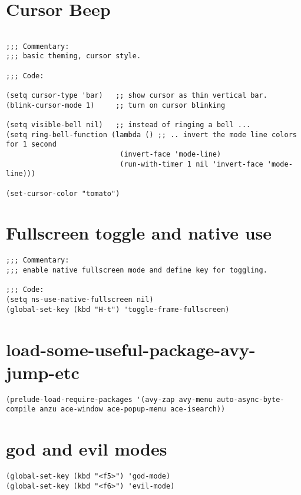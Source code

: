\documentclass[11pt]{article}
\begin{document}
\section{Cursor Beep}
\label{sec:orgd6a8681}

\begin{verbatim}

;;; Commentary:
;;; basic theming, cursor style.

;;; Code:

(setq cursor-type 'bar)   ;; show cursor as thin vertical bar.
(blink-cursor-mode 1)     ;; turn on cursor blinking

(setq visible-bell nil)   ;; instead of ringing a bell ...
(setq ring-bell-function (lambda () ;; .. invert the mode line colors for 1 second
                           (invert-face 'mode-line)
                           (run-with-timer 1 nil 'invert-face 'mode-line)))

(set-cursor-color "tomato")

\end{verbatim}

\section{Fullscreen toggle and native use}
\label{sec:orge483e92}

\begin{verbatim}
;;; Commentary:
;;; enable native fullscreen mode and define key for toggling.

;;; Code:
(setq ns-use-native-fullscreen nil)
(global-set-key (kbd "H-t") 'toggle-frame-fullscreen)
\end{verbatim}
\section{load-some-useful-package-avy-jump-etc}
\label{sec:orgbf3f289}

\begin{verbatim}
(prelude-load-require-packages '(avy-zap avy-menu auto-async-byte-compile anzu ace-window ace-popup-menu ace-isearch))

\end{verbatim}
\section{god and evil modes}
\label{sec:org7d140c9}
\begin{verbatim}
(global-set-key (kbd "<f5>") 'god-mode)
(global-set-key (kbd "<f6>") 'evil-mode)
\end{verbatim}
\end{document}

